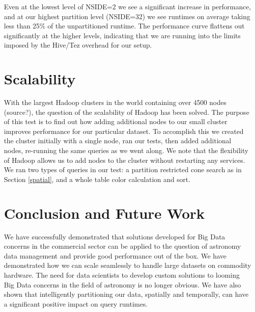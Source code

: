 \documentclass[11pt,twoside]{article}
\begin{document}


Even at the lowest level of NSIDE=2 we see a significant increase in performance, and at our highest partition level (NSIDE=32) we see runtimes on average taking less than 25\% of the unpartitioned runtime.  The performance curve flattens out significantly at the higher levels, indicating that we are running into the limits imposed by the Hive/Tez overhead for our setup. 

\section{Scalability}
With the largest Hadoop clusters in the world containing over 4500 nodes (source?), the question of the scalability of Hadoop has been solved.  The purpose of this test is to find out how adding additional nodes to our small cluster improves performance for our particular dataset.  To accomplish this we created the cluster initially with a single node, ran our tests, then added additional nodes, re-running the same queries as we went along.  We note that the flexibility of Hadoop allows us to add nodes to the cluster without restarting any services.  We ran two types of queries in our test:  a partition restricted cone search as in Section \ref{spatial}, and a whole table color calculation and sort.  


\section{Conclusion and Future Work}

We have successfully demonstrated that solutions developed for Big Data concerns in the commercial sector can be applied to the question of astronomy data management and provide good performance out of the box.  We have demonstrated how we can scale seamlessly to handle large datasets on commodity hardware.  The need for data scientists to develop custom solutions to looming Big Data concerns in the field of astronomy is no longer obvious.  We have also shown that intelligently partitioning our data, spatially and temporally, can have a significant positive impact on query runtimes.  
\end{document}
